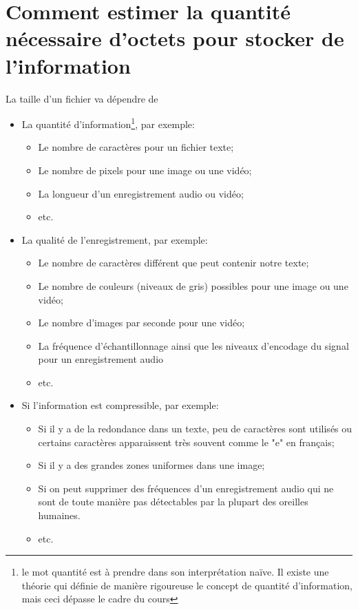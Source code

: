 \section{Comment estimer la quantité nécessaire d'octets pour stocker de l'information}
La taille d'un fichier va dépendre de 
\begin{itemize}
	\item La quantité d'information\footnote{le mot quantité est à prendre dans son interprétation naïve. Il existe une théorie qui définie de manière rigoureuse le concept de quantité d'information, mais ceci dépasse le cadre du cours}, par exemple:
		\begin{itemize}
			\item Le nombre de caractères pour un fichier texte;
			\item Le nombre de pixels pour une image ou une vidéo;
			\item La longueur d'un enregistrement audio ou vidéo;
			\item etc.
		\end{itemize}
	\item La qualité de l'enregistrement, par exemple:	
		\begin{itemize}
			\item Le nombre de caractères différent que peut contenir notre texte;
			\item Le nombre de couleurs (niveaux de gris) possibles pour une image ou une vidéo;
			\item Le nombre d'images par seconde pour une vidéo;
			\item La fréquence d'échantillonnage ainsi que les niveaux d'encodage du signal pour un enregistrement audio
			\item etc.
		\end{itemize}
	\item Si l'information est compressible, par exemple:
		\begin{itemize}
			\item Si il y a de la redondance dans un texte, peu de caractères sont utilisés ou certains caractères apparaissent très souvent comme le "e" en français;
			\item Si il y a des grandes zones uniformes dans une image;
			\item Si on peut supprimer des fréquences d'un enregistrement audio qui ne sont de toute manière pas détectables par la plupart des oreilles humaines.
			\item etc.
		\end{itemize}	
\end{itemize}
